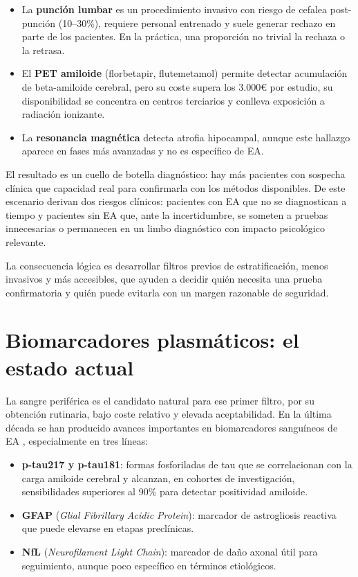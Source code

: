 \begin{itemize}
    \item La \textbf{punción lumbar} es un procedimiento invasivo con riesgo de cefalea post-punción (10--30\%), requiere personal entrenado y suele generar rechazo en parte de los pacientes. En la práctica, una proporción no trivial la rechaza o la retrasa.

    \item El \textbf{PET amiloide} (florbetapir, flutemetamol) permite detectar acumulación de beta-amiloide cerebral, pero su coste supera los 3.000€ por estudio, su disponibilidad se concentra en centros terciarios y conlleva exposición a radiación ionizante.

    \item La \textbf{resonancia magnética} detecta atrofia hipocampal, aunque este hallazgo aparece en fases más avanzadas y no es específico de EA.
\end{itemize}

El resultado es un cuello de botella diagnóstico: hay más pacientes con sospecha clínica que capacidad real para confirmarla con los métodos disponibles. De este escenario derivan dos riesgos clínicos: pacientes con EA que no se diagnostican a tiempo y pacientes sin EA que, ante la incertidumbre, se someten a pruebas innecesarias o permanecen en un limbo diagnóstico con impacto psicológico relevante.

La consecuencia lógica es desarrollar filtros previos de estratificación, menos invasivos y más accesibles, que ayuden a decidir quién necesita una prueba confirmatoria y quién puede evitarla con un margen razonable de seguridad.

\section{Biomarcadores plasmáticos: el estado actual}

La sangre periférica es el candidato natural para ese primer filtro, por su obtención rutinaria, bajo coste relativo y elevada aceptabilidad. En la última década se han producido avances importantes en biomarcadores sanguíneos de EA \parencite{blennow2023biomarkers,nakamura2018high,giau2021blood}, especialmente en tres líneas:

\begin{itemize}
    \item \textbf{p-tau217 y p-tau181}: formas fosforiladas de tau que se correlacionan con la carga amiloide cerebral y alcanzan, en cohortes de investigación, sensibilidades superiores al 90\% para detectar positividad amiloide.

    \item \textbf{GFAP} (\textit{Glial Fibrillary Acidic Protein}): marcador de astrogliosis reactiva que puede elevarse en etapas preclínicas.

    \item \textbf{NfL} (\textit{Neurofilament Light Chain}): marcador de daño axonal útil para seguimiento, aunque poco específico en términos etiológicos.
\end{itemize}

